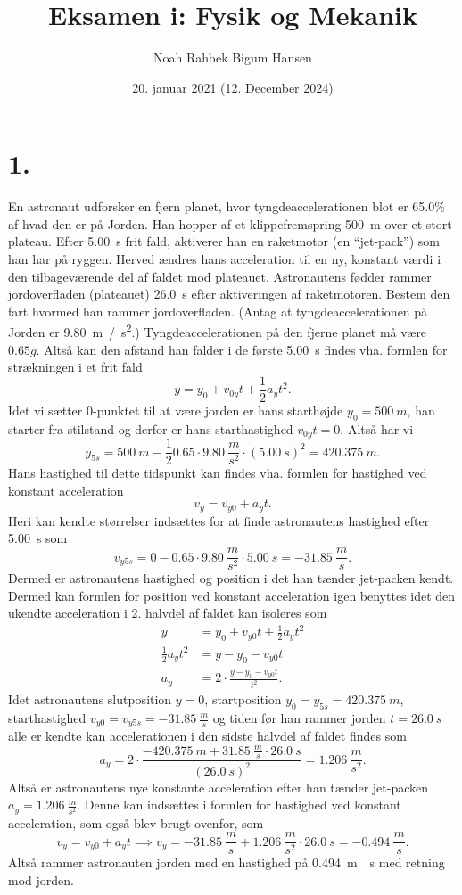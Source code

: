 \documentclass[12pt]{article}
\title{Eksamen i: Fysik og Mekanik}
\author{Noah Rahbek Bigum Hansen}
\date{20. januar 2021 (12. December 2024)}
\theoremstyle{definition}
\begin{document}
\maketitle

\section*{1.}
En astronaut udforsker en fjern planet, hvor tyngdeaccelerationen blot er \num{65,0}\% af hvad den er på Jorden. Han hopper af et klippefremspring \qty{500}{m} over et stort plateau. Efter \qty{5,00}{s} frit fald, aktiverer han en raketmotor (en “jet-pack”) som han har på ryggen. Herved ændres hans acceleration til en ny, konstant værdi i den tilbageværende del af faldet mod plateauet. Astronautens fødder rammer jordoverfladen (plateauet) \qty{26,0}{s} efter aktiveringen af raketmotoren. Bestem den fart hvormed han rammer jordoverfladen. (Antag at tyngdeaccelerationen på Jorden er \qty{9,80}{m / s^2}.)
\bigbreak
Tyngdeaccelerationen på den fjerne planet må være $\num{0,65}g$. Altså kan den afstand han falder i de første \qty{5,00}{s} findes vha. formlen for strækningen i et frit fald
\[ 
y = y_0 + v_{0y}t + \frac{1}{2}a_y t^2
.\]
Idet vi sætter 0-punktet til at være jorden er hans starthøjde $y_0 = \qty{500}{m}$, han starter fra stilstand og derfor er hans starthastighed $v_{0y}t = 0$. Altså har vi
\[ 
y_{5s} = \qty{500}{m} -\frac{1}{2} \num{0,65} \cdot \qty{9,80}{\frac{m}{s^2}} \cdot (\qty{5,00}{s})^2 = \qty{420,375}{m} 
.\]
Hans hastighed til dette tidspunkt kan findes vha. formlen for hastighed ved konstant acceleration
\[ 
v_{y} = v_{y0} + a_y t
.\]
Heri kan kendte størrelser indsættes for at finde astronautens hastighed efter \qty{5,00}{s} som
\[ 
v_{y5s} = 0 - \num{0,65} \cdot \qty{9,80}{\frac{m}{s^2}} \cdot \qty{5,00}{s} = \qty{-31,85}{\frac{m}{s}} 
.\]
Dermed er astronautens hastighed og position i det han tænder jet-packen kendt. Dermed kan formlen for position ved konstant acceleration igen benyttes idet den ukendte acceleration i 2. halvdel af faldet kan isoleres som
\begin{align*}
  y &= y_0 + v_{y0}t + \frac{1}{2}a_y t^2 \\
  \frac{1}{2}a_y t^2 &= y - y_0 - v_{y0}t \\
  a_y &= 2\cdot \frac{y - y_0 - v_{y0}t}{t^2}
.\end{align*}
Idet astronautens slutposition $y = 0$, startposition $y_0 = y_{5s} = \qty{420,375}{m}$, starthastighed $v_{y0} = v_{y5s} = - \qty{31,85}{\frac{m}{s}}$ og tiden før han rammer jorden $t = \qty{26,0}{s}$ alle er kendte kan accelerationen i den sidste halvdel af faldet findes som
\[ 
a_y = 2\cdot \frac{- \qty{420,375}{m} + \qty{31,85}{\frac{m}{s}} \cdot \qty{26,0}{s}}{(\qty{26,0}{s})^2 } = \qty{1,206}{\frac{m}{s^2}} 
.\]
Altså er astronautens nye konstante acceleration efter han tænder jet-packen $a_y = \qty{1,206}{\frac{m}{s^2}}$. Denne kan indsættes i formlen for hastighed ved konstant acceleration, som også blev brugt ovenfor, som
\[ 
  v_y = v_{y0} + a_y t \implies v_y = -\qty{31,85}{\frac{m}{s}} + \qty{1,206}{\frac{m}{s^2}} \cdot \qty{26,0}{s} = \qty{-0,494}{\frac{m}{s}} 
.\]
Altså rammer astronauten jorden med en hastighed på \qty{0,494}{m \per s} med retning mod jorden.
\end{document}
